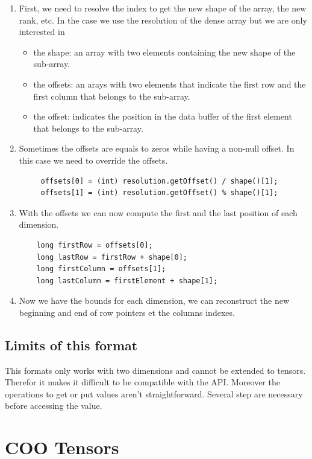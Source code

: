 \begin{enumerate}
\item First, we need to resolve the index to get the new shape of the array, the new rank, etc. In the case we use the resolution of the dense array but we are only interested in
\begin{itemize}
	\item the shape: an array with two elements containing the new shape of the sub-array.
	\item the offsets: an arays with two elements that indicate the first row and the first column that belongs to the sub-array.
	\item the offset: indicates the position in the data buffer of the first element that belongs to the sub-array.
\end{itemize}
 \item Sometimes the offsets are equals to zeros while having a non-null offset. In this case we need to override the offsets.
\begin{lstlisting}
	 offsets[0] = (int) resolution.getOffset() / shape()[1];
	 offsets[1] = (int) resolution.getOffset() % shape()[1];
\end{lstlisting}
\item With the offsets we can now compute the first and the last position of each dimension.
\begin{lstlisting}
	long firstRow = offsets[0];
	long lastRow = firstRow + shape[0];
	long firstColumn = offsets[1];
	long lastColumn = firstElement + shape[1];
\end{lstlisting}
\item Now we have the bounds for each dimension, we can reconstruct the new beginning and end of row pointers et the columns indexes.
\end{enumerate}


\subsection{Limits of this format}

This formats only works with two dimensions and cannot be extended to tensors. Therefor it makes it difficult to be compatible with the API.
Moreover the operations to get or put values aren't straightforward. Several step are necessary before accessing the value.

\section{COO Tensors}
